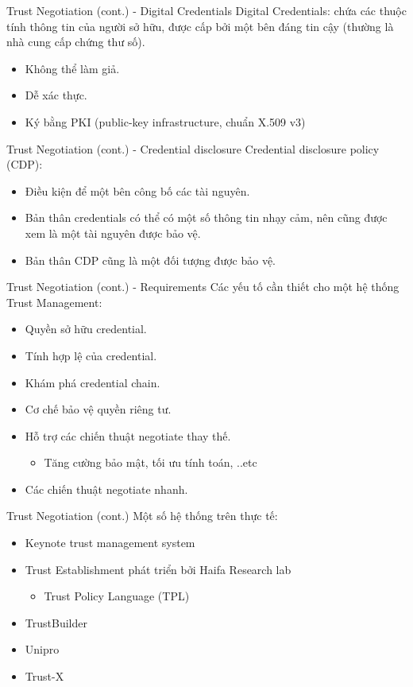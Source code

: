 \documentclass[11pt]{beamer}
\newcommand{\eg}{\text{e.g.\ }}
\begin{document}
\begin{frame}{Trust Negotiation (cont.) - Digital Credentials}
Digital Credentials: chứa các thuộc tính thông tin của người sở hữu, được cấp bởi một bên đáng tin cậy (thường là nhà cung cấp chứng thư số).
\begin{itemize}
\item Không thể làm giả.
\item Dễ xác thực.
\item Ký bằng PKI (public-key infrastructure, \eg chuẩn X.509 v3)
\end{itemize}
\end{frame}

\begin{frame}{Trust Negotiation (cont.) - Credential disclosure}
Credential disclosure policy (CDP):
\begin{itemize}
\item Điều kiện để một bên công bố các tài nguyên.
\item Bản thân credentials có thể có một số thông tin nhạy cảm, nên cũng được xem là một tài nguyên được bảo vệ.
\item Bản thân CDP cũng là một đối tượng được bảo vệ.
\end{itemize}
\end{frame}

\begin{frame}{Trust Negotiation (cont.) - Requirements}
Các yếu tố cần thiết cho một hệ thống Trust Management:
\begin{itemize}
\item Quyền sở hữu credential.
\item Tính hợp lệ của credential.
\item Khám phá credential chain.
\item Cơ chế bảo vệ quyền riêng tư.
\item Hỗ trợ các chiến thuật negotiate thay thế.
\begin{itemize}
\item \eg Tăng cường bảo mật, tối ưu tính toán, ..etc
\end{itemize}
\item Các chiến thuật negotiate nhanh.
\end{itemize}
\end{frame}

\begin{frame}{Trust Negotiation (cont.)}
Một số hệ thống trên thực tế:
\begin{itemize}
\item Keynote trust management system
\item Trust Establishment phát triển bởi Haifa Research lab
\begin{itemize}
\item Trust Policy Language (TPL)\cite{848442}
\end{itemize}
\item TrustBuilder
\item Unipro
\item Trust-X
\end{itemize}
\end{frame}
\end{document}

